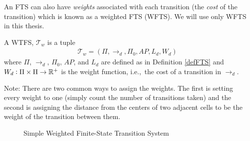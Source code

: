 An FTS can also have \textit{weights} associated with each transition (the \textit{cost} of the transition) which is known as a weighted FTS (WFTS). We will use only WFTS in this thesis.
\begin{definition}
\label{defWFTS}
A WTFS, $\mathcal{T}_w$ is a tuple 
\begin{align}
\mathcal{T}_w = (\Pi, \rightarrow_d, \Pi_0, AP,L_d,W_d)
\end{align}
where $\Pi$, $\rightarrow_d$, $\Pi_0$, $AP$, and $L_d$ are defined as in Definition \ref{defFTS} and $W_d: \Pi \times \Pi \rightarrow \mathbb{R}^+$ is the weight function, i.e.,\ the cost of a transition in $\rightarrow_d$. 
\end{definition}
Note: There are two common ways to assign the weights. The first is setting every weight to one (simply count the number of transitions taken) and the second is assigning the distance from the centers of two adjacent cells to be the weight of the transition between them. 

\begin{figure}
\centering
{}
\caption{Simple Weighted Finite-State Transition System}
\label{fig:ftsEx}
\end{figure}


